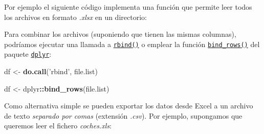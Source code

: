 \documentclass[]{book}
\newenvironment{Shaded}{\begin{snugshade}}{\end{snugshade}}
\newcommand{\KeywordTok}[1]{\textcolor[rgb]{0.13,0.29,0.53}{\textbf{#1}}}
\newcommand{\DataTypeTok}[1]{\textcolor[rgb]{0.13,0.29,0.53}{#1}}
\newcommand{\CharTok}[1]{\textcolor[rgb]{0.31,0.60,0.02}{#1}}
\newcommand{\StringTok}[1]{\textcolor[rgb]{0.31,0.60,0.02}{#1}}
\newcommand{\CommentTok}[1]{\textcolor[rgb]{0.56,0.35,0.01}{\textit{#1}}}
\newcommand{\ControlFlowTok}[1]{\textcolor[rgb]{0.13,0.29,0.53}{\textbf{#1}}}
\newcommand{\OperatorTok}[1]{\textcolor[rgb]{0.81,0.36,0.00}{\textbf{#1}}}
\newcommand{\NormalTok}[1]{#1}
\begin{document}
Por ejemplo el siguiente código implementa una función que permite leer
todos los archivos en formato \emph{.xlsx} en un directorio:

\begin{Shaded}
\end{Shaded}

Para combinar los archivos (suponiendo que tienen las mismas columnas),
podríamos ejecutar una llamada a
\href{https://www.rdocumentation.org/packages/base/versions/3.6.1/topics/rbind}{\texttt{rbind()}}
o emplear la función
\href{https://www.rdocumentation.org/packages/dplyr/versions/0.7.8/topics/bind}{\texttt{bind\_rows()}}
del paquete \href{https://dplyr.tidyverse.org}{\texttt{dplyr}}:

\begin{Shaded}
\begin{Highlighting}[]
\NormalTok{df <-}\StringTok{ }\KeywordTok{do.call}\NormalTok{(}\StringTok{'rbind'}\NormalTok{, file.list)}

\NormalTok{df <-}\StringTok{ }\NormalTok{dplyr}\OperatorTok{::}\KeywordTok{bind_rows}\NormalTok{(file.list)}
\end{Highlighting}
\end{Shaded}

Como alternativa simple se pueden exportar los datos desde Excel a un
archivo de texto \emph{separado por comas} (extensión \emph{.csv}). Por
ejemplo, supongamos que queremos leer el fichero \emph{coches.xls}:
\end{document}
